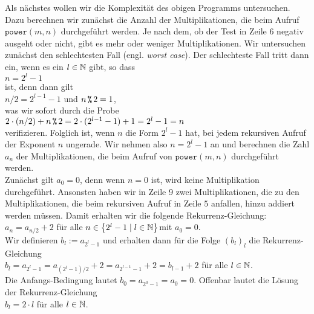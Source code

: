 Als n\"achstes wollen wir die Komplexit\"at des obigen Programms untersuchen. Dazu berechnen
wir zun\"achst die Anzahl der Multiplikationen, die beim Aufruf $\mathtt{power}(m,n)$
durchgef\"uhrt werden.  Je nach dem, ob der Test in Zeile 6 negativ ausgeht oder nicht, gibt
es mehr oder weniger Multiplikationen.  Wir untersuchen zun\"achst den schlechtesten Fall
(engl. \emph{worst case}).  Der schlechteste Fall tritt dann ein, wenn es
ein $l\in {\mathbb N}$ gibt, so dass \\[0.1cm]
\hspace*{1.3cm} $n = 2^l - 1$ \\[0.1cm]
ist, denn dann gilt \\[0.1cm]
\hspace*{1.3cm} $n/2 = 2^{l-1} - 1$ \quad und \quad $n \,\texttt{\symbol{37}}\, 2 = 1$, \\[0.1cm]
was wir sofort durch die Probe
\\[0.2cm]
\hspace*{1.3cm}
$2 \cdot(n/2) + n \,\texttt{\symbol{37}}\, 2 = 2 \cdot (2^{l-1} - 1) + 1 = 2^l - 1 = n$
\\[0.2cm]
verifizieren.  Folglich ist, wenn $n$ die Form $2^l - 1$ hat, bei jedem rekursiven Aufruf
der Exponent $n$ ungerade. 
Wir nehmen also $n = 2^l - 1$ an und berechnen die Zahl $a_n$ der Multiplikationen, die beim
Aufruf von $\mathtt{power}(m,n)$ durchgef\"uhrt werden. \\[0.1cm]
Zun\"achst gilt $a_0 = 0$, denn wenn $n =0$  ist, wird keine Multiplikation durchgef\"uhrt.
Ansonsten haben wir in Zeile 9 zwei Multiplikationen, die zu den Multiplikationen, die beim
rekursiven Aufruf in Zeile $5$ anfallen, hinzu addiert werden m\"ussen.  Damit erhalten wir
die folgende Rekurrenz-Gleichung: \\[0.1cm]
\hspace*{1.3cm} $a_n = a_{n/2} + 2$ \qquad f\"ur alle $n \in \left\{2^l - 1 \mid l \in {\mathbb N}\right\}$\quad mit $a_0 = 0$. \\[0.1cm]
Wir definieren $b_l := a_{2^l-1}$ und erhalten dann f\"ur die Folge $(b_l)_l$ die
Rekurrenz-Gleichung \\[0.1cm]
\hspace*{1.3cm} 
$b_l = a_{2^l-1} = a_{(2^l-1)/2} + 2 = a_{2^{l-1}-1} + 2 = b_{l-1} +2$ \qquad f\"ur alle $l\in{\mathbb N}$. \\[0.1cm]
Die Anfangs-Bedingung lautet $b_0 = a_{2^0-1} = a_0 = 0$.  
Offenbar lautet die L\"osung der Rekurrenz-Gleichung \\[0.1cm]
\hspace*{1.3cm} $b_l = 2 \cdot l$ \qquad f\"ur alle $l \in {\mathbb N}$. \\[0.1cm] 
